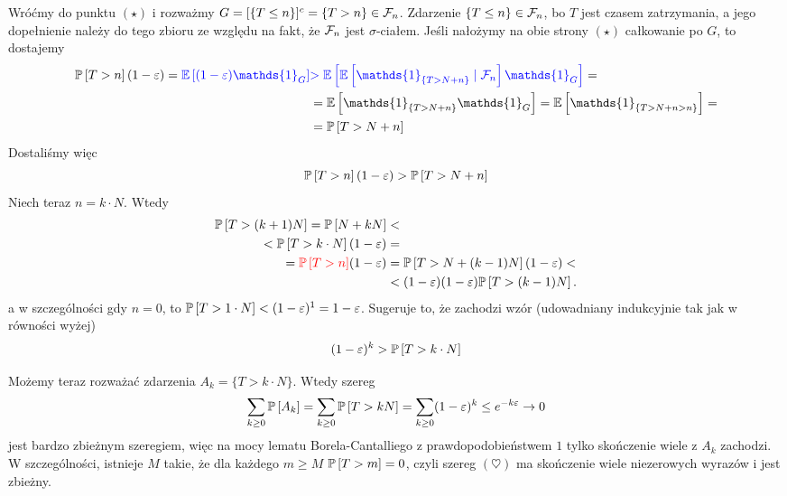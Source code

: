 \begin{solution}
  Wróćmy do punktu $(\star)$ i rozważmy $G=[\{T\leq n\}]^c=\{T>n\}\in\mathcal{F}_n$. Zdarzenie $\{T\leq n\}\in\mathcal{F}_n$, bo $T$ jest czasem zatrzymania, a jego dopełnienie należy do tego zbioru ze względu na fakt, że $\mathcal{F}_n$ jest $\sigma$-ciałem. Jeśli nałożymy na obie strony $(\star)$ całkowanie po $G$, to dostajemy
  \begin{align*}
    \prob{T>n}(1-\varepsilon)={\color{blue}\expected{(1-\varepsilon)\mathds{1}_G}}&{\color{blue}>\expected{\expected{\mathds{1}_{\{T> N+n\}}}{\set{F}_n}\mathds{1}_G} }=\\ 
                                                                                  &=\expected{\mathds{1}_{\{T> N+n\}}\mathds{1}_G}=\expected{\mathds{1}_{\{T>N+n>n\}}}=\\ 
                                                                                  &=\prob{T>N+n}
  \end{align*}
  Dostaliśmy więc
  $$\prob{T>n}(1-\varepsilon)>\prob{T>N+n}$$
  Niech teraz $n=k\cdot N$. Wtedy
  \begin{align*}
    \prob{T>(k+1)N}=\prob{N+kN}&<\\
    <\prob{T>k\cdot N}(1-\varepsilon)&=\\ 
    = {\color{red}\prob{T>n}}(1-\varepsilon)&=\prob{T>N+(k-1)N}(1-\varepsilon)<\\ 
                                                                             &<(1-\varepsilon)(1-\varepsilon)\prob{T>(k-1)N}.
  \end{align*}
  a w szczególności gdy $n=0$, to $\prob{T>1\cdot N}<(1-\varepsilon)^1=1-\varepsilon$. Sugeruje to, że zachodzi wzór (udowadniany indukcyjnie tak jak w równości wyżej)
  $$(1-\varepsilon)^k>\prob{T>k\cdot N}$$

  Możemy teraz rozważać zdarzenia $A_k=\{T>k\cdot N\}$. Wtedy szereg
  $$\sum_{k\geq0}\prob{A_k}=\sum_{k\geq0}\prob{T>kN}=\sum_{k\geq 0}(1-\varepsilon)^k\leq e^{-k\varepsilon}\to0$$
  jest bardzo zbieżnym szeregiem, więc na mocy lematu Borela-Cantalliego z prawdopodobieństwem $1$ tylko skończenie wiele z $A_k$ zachodzi. W szczególności, istnieje $M$ takie, że dla każdego $m\geq M$ $\prob{T>m}=0$, czyli szereg $(\heartsuit)$ ma skończenie wiele niezerowych wyrazów i jest zbieżny.
\end{solution}
